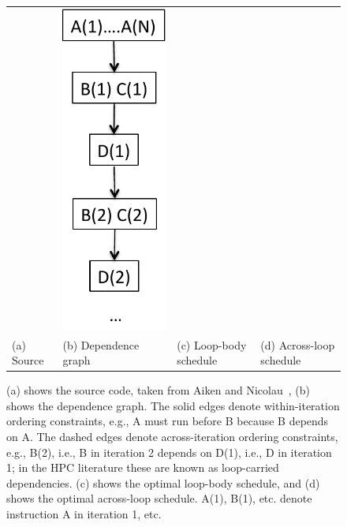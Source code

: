 \documentclass[sigconf, screen, natbib=false, dvipsnames, table]{acmart}
\theoremstyle{definition}
\begin{document}
\begin{figure}[tbhp]
\begin{tabular}{llll}
&

\begin{minipage}[b]{4.25cm}
\includegraphics[height=0.20\textheight]{figs/MPCaccrossLoop.pdf}
\end{minipage}
\\


(a) Source 
&
(b) Dependence graph
&
(c) Loop-body schedule
&
(d) Across-loop schedule

\end{tabular}
\caption{(a) shows the source code, taken from Aiken and Nicolau~\cite{Aiken:1988}, 
(b) shows the dependence graph. The solid edges denote within-iteration ordering constraints, e.g., A must run before B
because B depends on A. The dashed edges denote across-iteration ordering constraints, e.g., B(2), i.e., B in iteration 2
depends on D(1), i.e., D in iteration 1; in the HPC literature these are known as loop-carried dependencies. 
(c) shows the optimal loop-body schedule, and (d) shows the optimal across-loop schedule. A(1), B(1), etc. denote 
instruction A in iteration 1, etc.}
\label{fig:MPCexample}\vspace{-2ex}
\end{figure}
\end{document}
